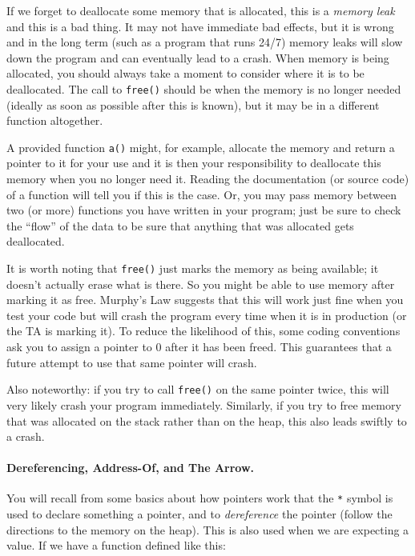 If we forget to deallocate some memory that is allocated, this is a \textit{memory leak} and this is a bad thing. It may not have immediate bad effects, but it is wrong and in the long term (such as a program that runs 24/7) memory leaks will slow down the program and can eventually lead to a crash. When memory is being allocated, you should always take a moment to consider where it is to be deallocated. The call to \texttt{free()} should be when the memory is no longer needed (ideally as soon as possible after this is known), but it may be in a different function altogether.

A provided function \texttt{a()} might, for example, allocate the memory and return a pointer to it for your use and it is then your responsibility to deallocate this memory when you no longer need it. Reading the documentation (or source code) of a function will tell you if this is the case. Or, you may pass memory between two (or more) functions you have written in your program; just be sure to check the ``flow'' of the data to be sure that anything that was allocated gets deallocated.

It is worth noting that \texttt{free()} just marks the memory as being available; it doesn't actually erase what is there. So you might be able to use memory after marking it as free. Murphy's Law suggests that this will work just fine when you test your code but will crash the program every time when it is in production (or the TA is marking it). To reduce the likelihood of this, some coding conventions ask you to assign a pointer to 0 after it has been freed. This guarantees that a future attempt to use that same pointer will crash.

Also noteworthy: if you try to call \texttt{free()} on the same pointer twice, this will very likely crash your program immediately. Similarly, if you try to free memory that was allocated on the stack rather than on the heap, this also leads swiftly to a crash.

\paragraph{Dereferencing, Address-Of, and The Arrow.}
You will recall from some basics about how pointers work that the \texttt{*} symbol is used to declare something a pointer, and to \textit{dereference} the pointer (follow the directions to the memory on the heap). This is also used when we are expecting a value. If we have a function defined like this:

